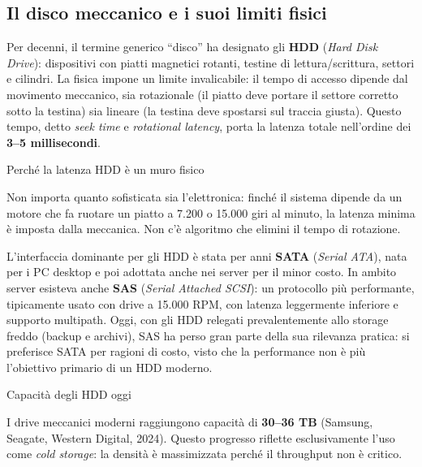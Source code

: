 \documentclass[
  italian,
  openany]{book}
\begin{document}
\subsection{Il disco meccanico e i suoi limiti
fisici}\label{il-disco-meccanico-e-i-suoi-limiti-fisici}

Per decenni, il termine generico ``disco'' ha designato gli \textbf{HDD}
(\emph{Hard Disk Drive}): dispositivi con piatti magnetici rotanti,
testine di lettura/scrittura, settori e cilindri. La fisica impone un
limite invalicabile: il tempo di accesso dipende dal movimento
meccanico, sia rotazionale (il piatto deve portare il settore corretto
sotto la testina) sia lineare (la testina deve spostarsi sul traccia
giusta). Questo tempo, detto \emph{seek time} e \emph{rotational
latency}, porta la latenza totale nell'ordine dei \textbf{3--5
millisecondi}.

\begin{callouttip}{Perché la latenza HDD è un muro fisico}

Non importa quanto sofisticata sia l'elettronica: finché il sistema
dipende da un motore che fa ruotare un piatto a 7.200 o 15.000 giri al
minuto, la latenza minima è imposta dalla meccanica. Non c'è algoritmo
che elimini il tempo di rotazione.

\end{callouttip}

L'interfaccia dominante per gli HDD è stata per anni \textbf{SATA}
(\emph{Serial ATA}), nata per i PC desktop e poi adottata anche nei
server per il minor costo. In ambito server esisteva anche \textbf{SAS}
(\emph{Serial Attached SCSI}): un protocollo più performante,
tipicamente usato con drive a 15.000 RPM, con latenza leggermente
inferiore e supporto multipath. Oggi, con gli HDD relegati
prevalentemente allo storage freddo (backup e archivi), SAS ha perso
gran parte della sua rilevanza pratica: si preferisce SATA per ragioni
di costo, visto che la performance non è più l'obiettivo primario di un
HDD moderno.

\begin{calloutnote}{Capacità degli HDD oggi}

I drive meccanici moderni raggiungono capacità di \textbf{30--36 TB}
(Samsung, Seagate, Western Digital, 2024). Questo progresso riflette
esclusivamente l'uso come \emph{cold storage}: la densità è massimizzata
perché il throughput non è critico.

\end{calloutnote}
\end{document}

